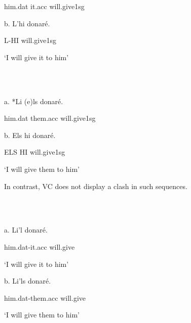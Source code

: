 \documentclass[output=paper,colorlinks,citecolor=brown]{./langscibook}
\begin{document}
          him.dat    it.acc    will.give1sg

   b. L’hi     donaré.

       L-HI    will.give1sg

  ‘I will give it to him’

\ea%
    \label{ex:key:14}
    \gll\\
        \\
    \glt
    \z

         a. *Li    (e)ls     donaré.

        him.dat    them.acc  will.give1sg

   b. Els hi  donaré.

      ELS HI  will.give1sg

  ‘I will give them to him’

In contrast, VC does not display a clash in such sequences.

\ea%
    \label{ex:key:15}
    \gll\\
        \\
    \glt
    \z

         a. Li’l     donaré. 

       him.dat-it.acc  will.give

  ‘I will give it to him’

  b. Li’ls    donaré.

      him.dat-them.acc  will.give

  ‘I will give them to him’
\end{document}
